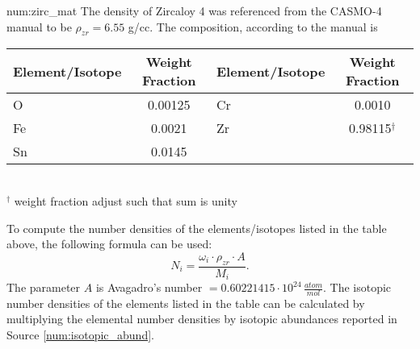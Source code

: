 \begin{numitem}{num:zirc_mat}
   The density of Zircaloy 4 was referenced from the CASMO-4 manual to be $\rho_{zr} = 6.55$ g/cc.  The composition, according to the manual is
 \begin{center}
  \begin{tabular}{l c l c}
    \toprule
    Element/Isotope & Weight Fraction & Element/Isotope & Weight Fraction \\
    \midrule
    \midrule
O    &  0.00125 &  Cr  &   0.0010 \\
Fe   &  0.0021  &  Zr  &   0.98115$^\dagger$   \\
Sn   &  0.0145  &   &    \\
    \bottomrule
  \end{tabular}
  \\ $^\dagger$ weight fraction adjust such that sum is unity
 \end{center}

To compute the number densities of the elements/isotopes listed in the table above, the following formula can be used:
\[
    N_i = \frac{\omega_i\cdot\rho_{zr}\cdot A}{M_i}.
\]
The parameter $A$ is Avagadro's number $=0.60221415\cdot 10^{24}\,\frac{atom}{mol}$. The isotopic number densities of the elements listed in the table can be calculated by multiplying the elemental number densities by isotopic abundances reported in Source \ref{num:isotopic_abund}.

\end{numitem}

